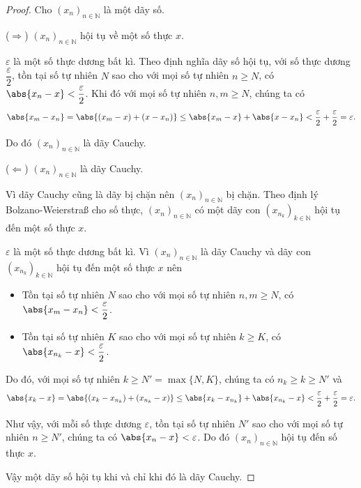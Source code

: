 \begin{proof}
    Cho ${(x_{n})}_{n\in\mathbb{N}}$ là một dãy số.

    ($\Rightarrow$) ${(x_{n})}_{n\in\mathbb{N}}$ hội tụ về một số thực $x$.

    $\varepsilon$ là một số thực dương bất kì. Theo định nghĩa dãy số hội tụ, với số thực dương $\dfrac{\varepsilon}{2}$, tồn tại số tự nhiên $N$ sao cho với mọi số tự nhiên $n\geq N$, có $\abs{x_{n} - x} < \dfrac{\varepsilon}{2}$. Khi đó với mọi số tự nhiên $n, m\geq N$, chúng ta có
    \[
        \abs{x_{m} - x_{n}} = \abs{(x_{m} - x) + (x - x_{n})}\leq \abs{x_{m} - x} + \abs{x - x_{n}} < \frac{\varepsilon}{2} + \frac{\varepsilon}{2} = \varepsilon.
    \]

    Do đó ${(x_{n})}_{n\in\mathbb{N}}$ là dãy Cauchy.

    ($\Leftarrow$) ${(x_{n})}_{n\in\mathbb{N}}$ là dãy Cauchy.

    Vì dãy Cauchy cũng là dãy bị chặn nên ${(x_{n})}_{n\in\mathbb{N}}$ bị chặn. Theo định lý Bolzano-Weierstra{\ss} cho số thực, ${(x_{n})}_{n\in\mathbb{N}}$ có một dãy con ${(x_{n_{k}})}_{k\in\mathbb{N}}$ hội tụ đến một số thực $x$.

    $\varepsilon$ là một số thực dương bất kì. Vì ${(x_{n})}_{n\in\mathbb{N}}$ là dãy Cauchy và dãy con ${(x_{n_{k}})}_{k\in\mathbb{N}}$ hội tụ đến một số thực $x$ nên
    \begin{itemize}
        \item Tồn tại số tự nhiên $N$ sao cho với mọi số tự nhiên $n, m\geq N$, có $\abs{x_{m} - x_{n}} < \dfrac{\varepsilon}{2}$.
        \item Tồn tại số tự nhiên $K$ sao cho với mọi số tự nhiên $k\geq K$, có $\abs{x_{n_{k}} - x} < \dfrac{\varepsilon}{2}$.
    \end{itemize}

    Do đó, với mọi số tự nhiên $k\geq N' = \max\{ N, K \}$, chúng ta có $n_{k}\geq k\geq N'$ và
    \[
        \abs{x_{k} - x} = \abs{(x_{k} - x_{n_{k}}) + (x_{n_{k}} - x)} \leq \abs{x_{k} - x_{n_{k}}} + \abs{x_{n_{k}} - x} < \frac{\varepsilon}{2} + \frac{\varepsilon}{2} = \varepsilon.
    \]

    Như vậy, với mỗi số thực dương $\varepsilon$, tồn tại số tự nhiên $N'$ sao cho với mọi số tự nhiên $n\geq N'$, chúng ta có $\abs{x_{n} - x} < \varepsilon$. Do đó ${(x_{n})}_{n\in\mathbb{N}}$ hội tụ đến số thực $x$.

    Vậy một dãy số hội tụ khi và chỉ khi đó là dãy Cauchy.
\end{proof}

